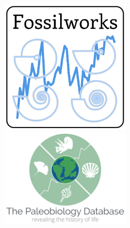 \documentclass{beamer}
\begin{document}
\begin{frame}
\begin{columns}
\begin{column}{0.6\textwidth}
      \includegraphics[height = 0.3\textheight, width = 0.5\textwidth, keepaspectratio = true]{figure/fossilworks}
      \includegraphics[width = 0.5\textwidth, keepaspectratio = true]{figure/paleodb}

    \end{column}
  \end{columns}
\end{frame}
\end{document}

